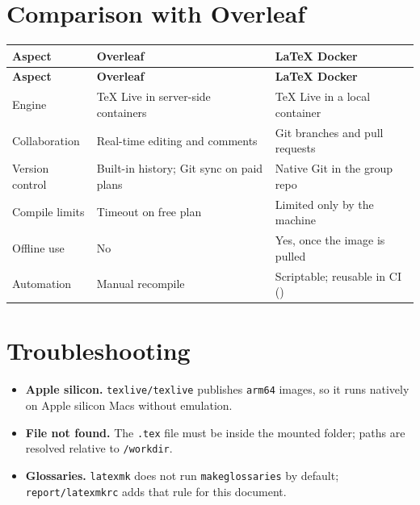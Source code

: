 \section{Comparison with Overleaf}
\begin{tabularx}{\linewidth}{L{3.0cm}YY}
\caption{Overleaf Compared with the LaTeX Container\label{Table:OverleafVsDocker}}\\
\toprule \textbf{Aspect} & \textbf{Overleaf} & \textbf{LaTeX Docker}\\ \midrule
\endfirsthead
\toprule \textbf{Aspect} & \textbf{Overleaf} & \textbf{LaTeX Docker}\\ \midrule
\endhead \bottomrule \endlastfoot
Engine & TeX Live in server-side containers & TeX Live in a local container\\
Collaboration & Real-time editing and comments & Git branches and pull requests\\
Version control & Built-in history; Git sync on paid plans & Native Git in the group repo\\
Compile limits & Timeout on free plan & Limited only by the machine\\
Offline use & No & Yes, once the image is pulled\\
Automation & Manual recompile & Scriptable; reusable in CI ()\\
\end{tabularx}

\section{Troubleshooting}
\begin{itemize}
\item \textbf{Apple silicon.} \texttt{texlive/texlive} publishes
\texttt{arm64} images, so it runs natively on Apple silicon Macs without
emulation.
\item \textbf{File not found.} The \texttt{.tex} file must be inside the
mounted folder; paths are resolved relative to \texttt{/workdir}.
\item \textbf{Glossaries.} \texttt{latexmk} does not run
\texttt{makeglossaries} by default; \texttt{report/latexmkrc} adds that rule
for this document.
\end{itemize}
